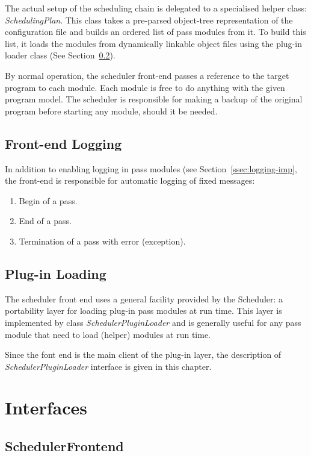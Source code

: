 \documentclass[a4paper,twoside]{tce}
\begin{document}
The actual setup of the scheduling chain is delegated to a specialised
helper class: \emph{SchedulingPlan}. This class takes a pre-parsed
object-tree representation of the configuration file and builds an ordered
list of pass modules from it. To build this list, it loads the modules from
dynamically linkable object files using the plug-in loader class (See
Section~\ref{ssec:plugin-loader}).

By normal operation, the scheduler front-end passes a reference to the
target program to each module. Each module is free to do anything with the
given program model. The scheduler is responsible for making a backup of the
original program before starting any module, should it be needed.

\subsection{Front-end Logging}

In addition to enabling logging in pass modules (see
Section~\ref{ssec:logging-imp}, the front-end is responsible for automatic
logging of fixed messages:
\begin{enumerate}
\item %
  Begin of a pass.
\item %
  End of a pass.
\item %
  Termination of a pass with error (exception).
\end{enumerate}

\subsection{Plug-in Loading}
\label{ssec:plugin-loader}

The scheduler front end uses a general facility provided by the Scheduler: a
portability layer for loading plug-in pass modules at run time. This layer
is implemented by class \emph{SchedulerPluginLoader} and is generally useful
for any pass module that need to load (helper) modules at run time.

Since the font end is the main client of the plug-in layer, the description
of \emph{SchedulerPluginLoader} interface is given in this chapter.

\section{Interfaces}

\subsection{SchedulerFrontend}
\label{ssec:SchedulerFrontend-if}
\end{document}
